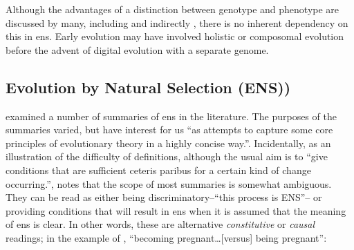 Although the advantages of a distinction between genotype and phenotype are discussed by many, including \parencite[section 7.2.3]{Taylor1999} and indirectly \cite{VonNeumann1966}, there is no inherent dependency on this in \gls{ens}. Early evolution may have involved holistic or composomal evolution before the advent of digital evolution with a separate genome.




\subsection{Evolution by Natural Selection (ENS))}\label{ens-evolution-by-natural-selection}

\cite{Godfrey-Smith2007} examined a number of summaries of \gls{ens} in the literature. The purposes of the summaries varied, but have interest for us ``as attempts to capture some core principles of evolutionary theory in a highly concise way.''. Incidentally, as an illustration of the difficulty of definitions, although the usual aim is to ``give conditions that are sufficient ceteris paribus for a certain kind of change occurring.'', \cite{Godfrey-Smith2007} notes that the scope of most summaries is somewhat ambiguous. They can be read as either being discriminatory--``this process is ENS''-- or providing conditions that will result in \gls{ens} when it is assumed that the meaning of \gls{ens} is clear. In other words, these are alternative \emph{constitutive} or \emph{causal} readings; in the example of \cite{Godfrey-Smith2007}, ``becoming pregnant\ldots{}{[}versus{]} being pregnant'':

